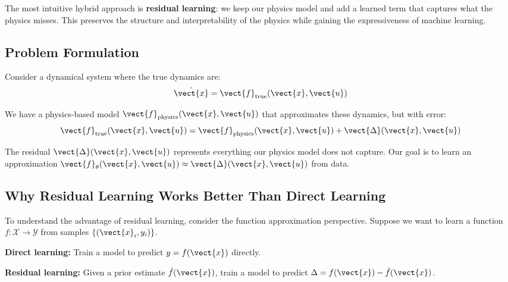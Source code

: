 The most intuitive hybrid approach is \textbf{residual learning}: we keep our physics model and add a learned term that captures what the physics misses. This preserves the structure and interpretability of the physics while gaining the expressiveness of machine learning.

\subsection{Problem Formulation}

Consider a dynamical system where the true dynamics are:
\begin{equation}
\dot{\vect{x}} = \vect{f}_{\text{true}}(\vect{x}, \vect{u})
\label{eq:true_dynamics}
\end{equation}

We have a physics-based model $\vect{f}_{\text{physics}}(\vect{x}, \vect{u})$ that approximates these dynamics, but with error:
\begin{equation}
\vect{f}_{\text{true}}(\vect{x}, \vect{u}) = \vect{f}_{\text{physics}}(\vect{x}, \vect{u}) + \vect{\Delta}(\vect{x}, \vect{u})
\label{eq:residual_definition}
\end{equation}

The residual $\vect{\Delta}(\vect{x}, \vect{u})$ represents everything our physics model does not capture. Our goal is to learn an approximation $\vect{f}_\theta(\vect{x}, \vect{u}) \approx \vect{\Delta}(\vect{x}, \vect{u})$ from data.


\subsection{Why Residual Learning Works Better Than Direct Learning}

To understand the advantage of residual learning, consider the function approximation perspective. Suppose we want to learn a function $f: \mathcal{X} \to \mathcal{Y}$ from samples $\{(\vect{x}_i, y_i)\}$.

\textbf{Direct learning:} Train a model to predict $y = f(\vect{x})$ directly.

\textbf{Residual learning:} Given a prior estimate $\hat{f}(\vect{x})$, train a model to predict $\Delta = f(\vect{x}) - \hat{f}(\vect{x})$.

